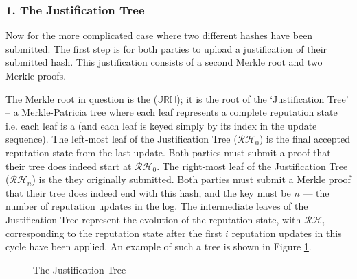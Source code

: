 \subsubsection*{1. The Justification Tree}
  \newcommand{\jrh}{\ensuremath{\mathbb{JRH}}}
Now for the more complicated case where two different hashes have been submitted. The first step is for both parties to upload a justification of their submitted hash. This justification consists of a second Merkle root and two Merkle proofs.

The Merkle root in question is the  (\jrh); it is the root of the `Justification Tree' -- a Merkle-Patricia tree where each leaf represents a complete reputation state i.e. each leaf is a  (and each leaf is keyed simply by its index in the update sequence). The left-most leaf of the Justification Tree ($\mathcal{RH}_0$) is the final accepted reputation state from the last update. Both parties must submit a proof that their tree does indeed start at $\mathcal{RH}_0$. The right-most leaf of the Justification Tree ($\mathcal{RH}_n$) is the  they originally submitted. Both parties must submit a Merkle proof that their tree does indeed end with this hash, and the key must be $n$ --- the number of reputation updates in the log. The intermediate leaves of the Justification Tree represent the evolution of the reputation state, with $\mathcal{RH}_i$ corresponding to the reputation state after the first $i$ reputation updates in this cycle have been applied. An example of such a tree is shown in Figure \ref{fig:justification-tree}.

\begin{figure}
\centering
{}
\caption{The Justification Tree }
\label{fig:justification-tree}
\end{figure}

